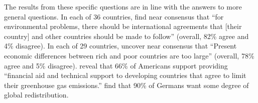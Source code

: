 The results from these specific questions are in line with the answers to more general questions. In each of 36 countries, \citet{issp_international_2010} find near consensus that ``for environmental problems, there should be international agreements that [their country] and other countries should be made to follow'' (overall, 82\% agree and 4\% disagree). %
In each of 29 countries, \citet{issp_international_2019} uncover near consensus that ``Present economic differences between rich and poor countries are too large'' (overall, 78\% agree and 5\% disagree). \cite{leiserowitz_public_2021} reveal that 66\% of Americans support providing ``financial aid and technical support to developing countries that agree to limit their greenhouse gas emissions.'' \citet{fehr_your_2022} find that 90\% of Germans want some degree of global redistribution. %

